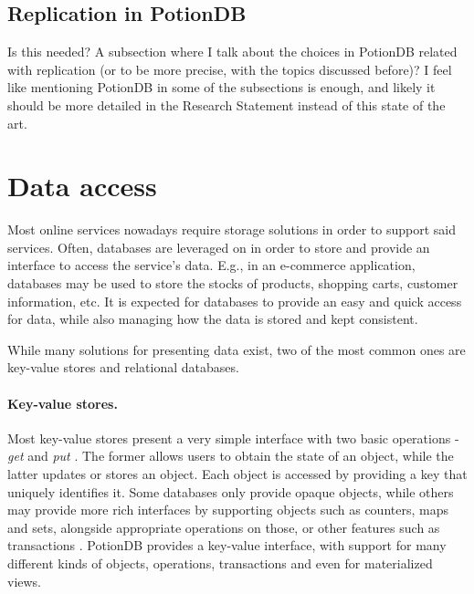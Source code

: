 


\subsection{Replication in PotionDB}
Is this needed? A subsection where I talk about the choices in PotionDB related with replication (or to be more precise, with the topics discussed before)? I feel like mentioning PotionDB in some of the subsections is enough, and likely it should be more detailed in the Research Statement instead of this state of the art.


\section{Data access}

Most online services nowadays require storage solutions in order to support said services.
Often, databases are leveraged on in order to store and provide an interface to access the service's data.
E.g., in an e-commerce application, databases may be used to store the stocks of products, shopping carts, customer information, etc.
It is expected for databases to provide an easy and quick access for data, while also managing how the data is stored and kept consistent.

While many solutions for presenting data exist, two of the most common ones are key-value stores and relational databases.

\paragraph{Key-value stores.}
Most key-value stores present a very simple interface with two basic operations - \emph{get} and \emph{put} \cite{dynamo, cops, cure, walter, pequod}.	%
The former allows users to obtain the state of an object, while the latter updates or stores an object.
Each object is accessed by providing a key that uniquely identifies it.
Some databases only provide opaque objects, while others may provide more rich interfaces by supporting objects such as counters, maps and sets, alongside appropriate operations on those, or other features such as transactions \cite{cure, walter, pequod}.	%
PotionDB provides a key-value interface, with support for many different kinds of objects, operations, transactions and even for materialized views.


